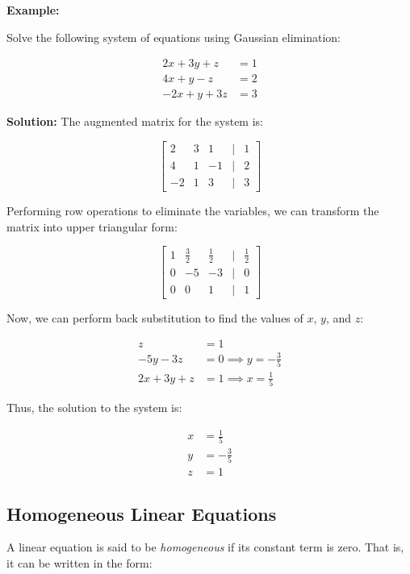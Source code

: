 \textbf{Example:}

Solve the following system of equations using Gaussian elimination:

\begin{align*}
	2x + 3y + z  & = 1 \\
	4x + y - z   & = 2 \\
	-2x + y + 3z & = 3
\end{align*}

\textbf{Solution:} The augmented matrix for the system is:

\[
	\begin{bmatrix}
		2  & 3 & 1  & | & 1 \\
		4  & 1 & -1 & | & 2 \\
		-2 & 1 & 3  & | & 3
	\end{bmatrix}
\]

Performing row operations to eliminate the variables, we can transform the matrix into upper triangular form:

\[
	\begin{bmatrix}
		1 & \frac{3}{2} & \frac{1}{2} & | & \frac{1}{2} \\
		0 & -5          & -3          & | & 0           \\
		0 & 0           & 1           & | & 1
	\end{bmatrix}
\]

Now, we can perform back substitution to find the values of \(x\), \(y\), and \(z\):

\begin{align*}
	z           & = 1                           \\
	-5y - 3z    & = 0 \implies y = -\frac{3}{5} \\
	2x + 3y + z & = 1 \implies x = \frac{1}{5}
\end{align*}

Thus, the solution to the system is:

\begin{align*}
	x & = \frac{1}{5}  \\
	y & = -\frac{3}{5} \\
	z & = 1
\end{align*}

\subsection{Homogeneous Linear Equations}

A linear equation is said to be \emph{homogeneous} if its constant term is zero. That is, it 
can be written in the form:

